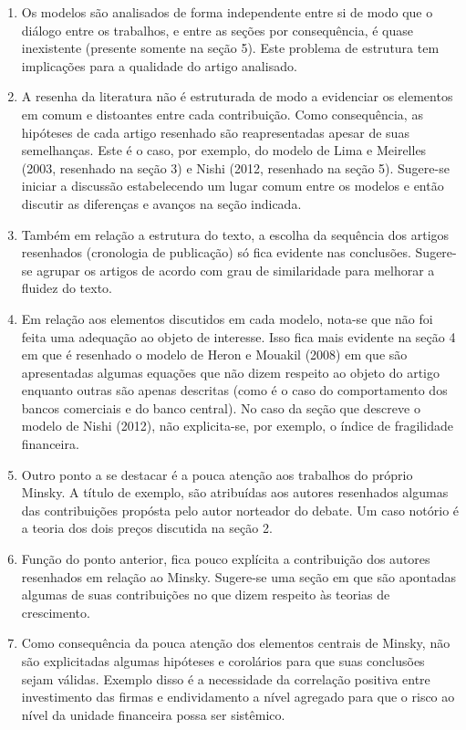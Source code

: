 \documentclass[11pt]{article}
\begin{document}
\begin{enumerate}
\item Os modelos são analisados de forma independente entre si de modo que o diálogo entre os trabalhos, e entre as seções por consequência, é quase inexistente (presente somente na seção 5).
Este problema de estrutura tem implicações para a qualidade do artigo analisado.
\item A resenha da literatura não é estruturada de modo a evidenciar os elementos em comum e distoantes entre cada contribuição.
Como consequência, as hipóteses de cada artigo resenhado são reapresentadas apesar de suas semelhanças.
Este é o caso, por exemplo, do modelo de Lima e Meirelles (2003, resenhado na seção 3) e Nishi (2012, resenhado na seção 5).
Sugere-se iniciar a discussão estabelecendo um lugar comum entre os modelos e então discutir as diferenças e avanços na seção indicada.
\item Também em relação a estrutura do texto, a escolha da sequência dos artigos resenhados (cronologia de publicação) só fica evidente nas conclusões. Sugere-se agrupar os artigos de acordo com grau de similaridade para melhorar a fluidez do texto.
\item Em relação aos elementos discutidos em cada modelo, nota-se que não foi feita uma adequação ao objeto de interesse.
Isso fica mais evidente na seção 4 em que é resenhado o modelo de Heron e Mouakil (2008) em que são apresentadas algumas equações que não dizem respeito ao objeto do artigo enquanto outras são apenas descritas (como é o caso do comportamento dos bancos comerciais e do banco central). No caso da seção que descreve o modelo de Nishi (2012), não explicita-se, por exemplo, o índice de fragilidade financeira.
\item Outro ponto a se destacar é a pouca atenção aos trabalhos do próprio Minsky. A título de exemplo, são atribuídas aos autores resenhados algumas das contribuições propósta pelo autor norteador do debate. Um caso notório é a teoria dos dois preços discutida na seção 2.
\item Função do ponto anterior, fica pouco explícita a contribuição dos autores resenhados em relação ao Minsky. Sugere-se uma seção em que são apontadas algumas de suas contribuições no que dizem respeito às teorias de crescimento.
\item Como consequência da pouca atenção dos elementos centrais de Minsky, não são explicitadas algumas hipóteses e corolários para que suas conclusões sejam válidas. Exemplo disso é a necessidade da correlação positiva entre investimento das firmas e endividamento a nível agregado para que o risco ao nível da unidade financeira possa ser sistêmico.

\end{enumerate}
\end{document}
